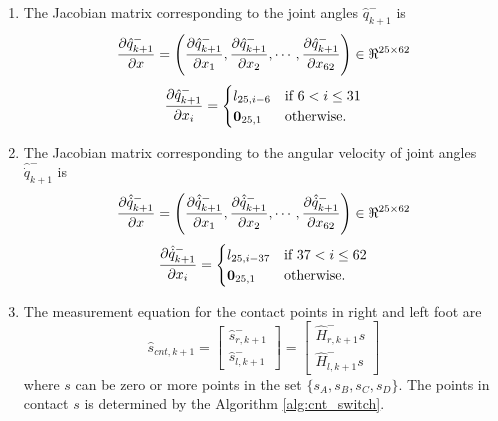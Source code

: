 \begin{enumerate}
\item The Jacobian matrix corresponding to the joint angles $\hat{q}_{k+1}^-$ is
\begin{equation}
\label{eq:dq_msrdx}
\frac{\partial {\hat{q}_{k+1}^-}}{\partial {x}} = \left(\frac{\partial {\hat{q}_{k+1}^-}}{\partial {x_{1}}}, \frac{\partial {\hat{q}_{k+1}^-}}{\partial {x_{2}}}, \cdots , \frac{\partial {\hat{q}_{k+1}^-}}{\partial {x_{62}}}\right) \in \Re^{25 \times 62}
\end{equation}
 \[
 \frac{\partial {\hat{q}_{k+1}^-}}{\partial {x_{i}}} =
 \begin{cases}
 l_{25,i-6} & \text{if } 6 < i \leq 31 \\
 \textbf{0}_{25,1} & \text{otherwise}.
 \end{cases}
 \]

\item The Jacobian matrix corresponding to the angular velocity of joint angles  $\hat{\dot{q}}_{k+1}^-$ is 
\begin{equation}
 \label{eq:ddq_msrdx}
\frac{\partial {\hat{\dot{q}}_{k+1}^-}}{\partial {x}} = \left(\frac{\partial {\hat{\dot{q}}_{k+1}^-}}{\partial {x_{1}}}, \frac{\partial {\hat{\dot{q}}_{k+1}^-}}{\partial {x_{2}}}, \cdots , \frac{\partial {\hat{\dot{q}}_{k+1}^-}}{\partial {x_{62}}}\right) \in \Re^{25 \times 62}
\end{equation}
  \[
 \frac{\partial {\hat{\dot{q}}_{k+1}^-}}{\partial {x_{i}}} =
 \begin{cases}
 l_{25,i-37} & \text{if } 37 < i \leq 62 \\
 \textbf{0}_{25,1} & \text{otherwise}.
 \end{cases}
 \]

 \item The measurement equation for the contact points in right and left foot are 
 $$ \hat{s}_{cnt,k+1}=
 \begin{bmatrix}
 \hat{s}_{r,k+1}^- \\ \hat{s}_{l,k+1}^-
 \end{bmatrix} 
 = \begin{bmatrix}
 \hat{H}_{r,k+1}^- s  \\ \hat{H}_{l,k+1}^- s
   \end{bmatrix}
	$$ 
where $s$ can be zero or more points in the set $ \lbrace s_A,s_B,s_C,s_D \rbrace$. The points in contact $s$ is determined by the Algorithm \ref{alg:cnt_switch}. 


\end{enumerate}
